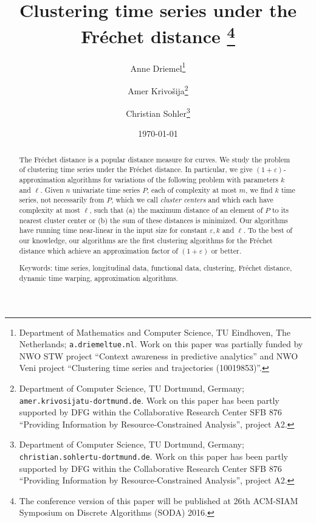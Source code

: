 \documentclass[11pt, letter]{article}
\newcommand{\Frechet}{Fr\'echet\xspace}
\newcommand{\atgen}{\symbol{'100}}
\providecommand{\eps}{{\varepsilon}}\newcommand{\Astop}{\overline{a}}
\newcommand{\nrClusters}{\ensuremath{k}}
\newcommand{\lenClusters}{\ensuremath{\ell}}
\begin{document}
\title{Clustering time series under the \Frechet distance
\thanks{The conference version of this paper will be published at 26th ACM-SIAM Symposium on Discrete Algorithms (SODA) 2016.}
}

\author{Anne Driemel\thanks{Department of Mathematics and Computer Science, TU Eindhoven, The
   Netherlands; 
      \texttt{a.driemel}\hspace{0cm}\texttt{\atgen{}tue.nl}. 
      Work on this paper was partially funded by NWO STW project ``Context
      awareness in predictive analytics'' and NWO Veni project ``Clustering time
      series and trajectories (10019853)''. } \and Amer Krivo\v{s}ija\thanks{Department of Computer Science, TU Dortmund, Germany; 
      \texttt{amer.krivosija}\hspace{0cm}\texttt{\atgen{}tu-dortmund.de}. Work on this paper has been partly supported by DFG within the Collaborative Research Center SFB 876 ``Providing Information by Resource-Constrained Analysis'', project A2.} \and Christian Sohler\thanks{Department of Computer Science, TU Dortmund, Germany; 
      \texttt{christian.sohler}\hspace{0cm}\texttt{\atgen{}tu-dortmund.de}. Work on this paper has been partly supported by DFG within the Collaborative Research Center SFB 876 ``Providing Information by Resource-Constrained Analysis'', project A2.} }

\date{\today}

\maketitle

\begin{abstract}
The \Frechet{} distance is a popular distance measure for curves. We study the problem of clustering time series under the \Frechet{} distance.  In particular, we give $(1+\eps)$-approximation algorithms for variations of the following problem with parameters $\nrClusters$ and $\lenClusters$.  Given $n$ univariate time series $P$, each of complexity at most $m$, we find $\nrClusters$ time series, not necessarily from $P$, which we call \emph{cluster centers} and which each have complexity at most $\lenClusters$, such that (a) the maximum distance of an element of $P$ to its nearest cluster center or (b) the sum of these distances is minimized.  Our algorithms have running time near-linear in the input size for constant $\eps, \nrClusters$ and $\lenClusters$.  To the best of our knowledge, our algorithms are the first clustering algorithms for the \Frechet{} distance which achieve an approximation factor of $(1+\eps)$ or better. 

Keywords: time series, longitudinal data, functional data, clustering, \Frechet{} distance, dynamic time warping, approximation algorithms.
\end{abstract}
\vfill
\thispagestyle{empty}
\pagebreak
\setcounter{page}{1}
\end{document}
